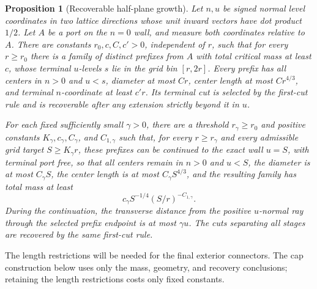 \documentclass[11pt]{article}
\numberwithin{equation}{section}
\newtheorem*{unnumberedproposition}{Proposition}
\theoremstyle{definition}\newtheorem{definition}[theorem]{Definition}
\theoremstyle{remark}\newtheorem{remark}[theorem]{Remark}
\begin{document}
\begin{unnumberedproposition}[Recoverable half-plane growth]
\label{L:prop:recoverable-growth}
\label{L:prop:length-controlled-growth}
Let \(n,u\) be signed normal level coordinates in two lattice directions
whose unit inward vectors have dot product \(1/2\). Let \(A\) be a port
on the \(n=0\) wall, and measure both coordinates relative to \(A\).
There are constants \(r_0,c,C,c'>0\), independent of \(r\), such that
for every \(r\ge r_0\) there is a family of distinct prefixes from \(A\)
with total critical mass at least \(c\), whose terminal \(u\)-levels
\(s\) lie in the grid bin \([r,2r]\). Every prefix has all centers in
\(n>0\) and \(u<s\), diameter at most \(Cr\), center length at most
\(Cr^{4/3}\), and terminal \(n\)-coordinate at least \(c'r\).
Its terminal cut is selected by the first-cut rule and is recoverable
after any extension strictly beyond it in \(u\).

For each fixed sufficiently small \(\gamma>0\), there are a threshold
\(r_\gamma\ge r_0\) and positive constants \(K_\gamma,c_\gamma,C_\gamma\),
and \(C_{1,\gamma}\) such that, for every \(r\ge r_\gamma\) and every
admissible grid target \(S\ge K_\gamma r\), these prefixes can be
continued to the exact wall \(u=S\), with terminal port free, so that
all centers remain in \(n>0\) and \(u<S\), the diameter is at most
\(C_\gamma S\), the center length is at most \(C_\gamma S^{4/3}\),
and the resulting family has total mass at least
\[
 c_\gamma S^{-1/4}(S/r)^{-C_{1,\gamma}}.
\]
During the continuation, the transverse distance from the positive
\(u\)-normal ray through the selected prefix endpoint is at most
\(\gamma u\). The cuts separating all stages are recovered by the same
first-cut rule.
\end{unnumberedproposition}

The length restrictions will be needed for the final exterior connectors.
The cap construction below uses only the mass, geometry, and recovery
conclusions; retaining the length restrictions costs only fixed constants.
\end{document}
